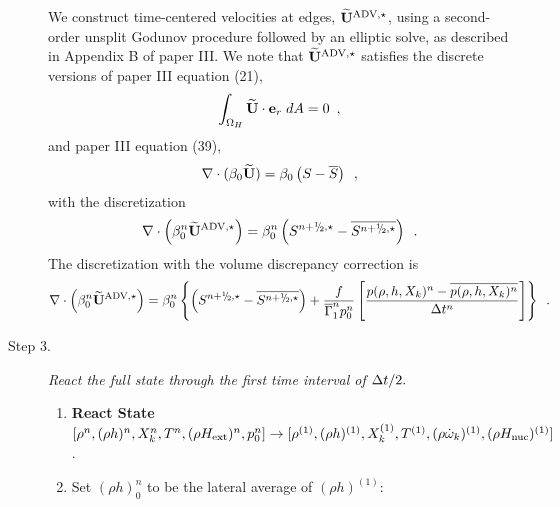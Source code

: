 \begin{description}
We construct time-centered velocities at edges, $\widetilde{\mathbf{U}}^{\mathrm{ADV},\star}$, 
using a second-order unsplit Godunov procedure followed by an elliptic
solve, as described in Appendix B of paper III.  We note that 
$\widetilde{\mathbf{U}}^{\mathrm{ADV},\star}$ satisfies the discrete versions of paper III equation (21),
\begin{equation}
\int_{\Omega_H} \widetilde{{\bf U}} \cdot {\bf e}_r \; dA = 0 \label{eq:udoterzero} \enskip ,
\end{equation}
and paper III equation (39),
\begin{equation}
\nabla \cdot (\beta_0 \widetilde{{\bf U}} )  = \beta_0 \left(S - \overline{S} \right )\enskip ,
\label{eq:tildeconstraint}
\end{equation}
with the discretization
\begin{equation}
\nabla \cdot \left(\beta_0^n \uadvone\right) = 
\beta_0^n \left(S^{\nph,\star} - \overline{S^{\nph,\star}}\right) \enskip .
\end{equation}
The discretization with the volume discrepancy correction is
\begin{equation}
\nabla \cdot \left(\beta_0^n \uadvone\right) = 
\beta_0^n \left\{ \left(S^{\nph,\star} - \overline{S^{\nph,\star}}\right)
+ \frac{f}{\gammabar^n p_0^n}
\left[\frac{p(\rho,h,X_k)^n - \overline{p(\rho,h,X_k)^n}}{\Delta t^n}\right]\right\} \enskip .
\end{equation}

\item[Step 3.] {\em React the full state through the first time interval of $\Delta t / 2.$}

\begin{enumerate}
\renewcommand{\theenumi}{{\bf \alph{enumi}}}

\item {\bf React State}$[\rho^n, (\rho h)^n, X_k^n, T^n, (\rho{H_{\rm ext}})^n, p_0^n] \rightarrow
[ \rho^{(1)},(\rho h)^{(1)},X_k^{(1)},T^{(1)},(\rho \dot{\omega}_k)^{(1)},(\rho {H_{\rm nuc}})^{(1)} ]$.

\item Set $(\rho h)_0^n$ to be the lateral average of $(\rho h)^{(1)}$:


\end{enumerate}
\end{description}
